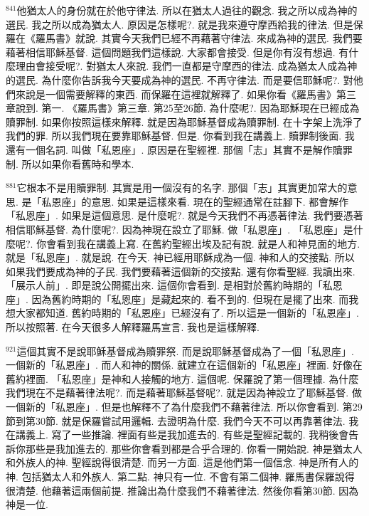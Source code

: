 \documentclass{book}
\begin{document}
$^{841}$他猶太人的身份就在於他守律法.
所以在猶太人過往的觀念.
我之所以成為神的選民.
我之所以成為猶太人.
原因是怎樣呢?.
就是我來遵守摩西給我的律法.
但是保羅在《羅馬書》就說.
其實今天我們已經不再藉著守律法.
來成為神的選民.
我們要藉著相信耶穌基督.
這個問題我們這樣說.
大家都會接受.
但是你有沒有想過.
有什麼理由會接受呢?.
對猶太人來說.
我們一直都是守摩西的律法.
成為猶太人成為神的選民.
為什麼你告訴我今天要成為神的選民.
不再守律法.
而是要信耶穌呢?.
對他們來說是一個需要解釋的東西.
而保羅在這裡就解釋了.
如果你看《羅馬書》第三章說到.
第一.
《羅馬書》第三章.
第25至26節.
為什麼呢?.
因為耶穌現在已經成為贖罪制.
如果你按照這樣來解釋.
就是因為耶穌基督成為贖罪制.
在十字架上洗淨了我們的罪.
所以我們現在要靠耶穌基督.
但是.
你看到我在講義上.
贖罪制後面.
我還有一個名詞.
叫做「私恩座」.
原因是在聖經裡.
那個「志」其實不是解作贖罪制.
所以如果你看舊時和學本.

$^{881}$它根本不是用贖罪制.
其實是用一個沒有的名字.
那個「志」其實更加常大的意思.
是「私恩座」的意思.
如果是這樣來看.
現在的聖經通常在註腳下.
都會解作「私恩座」.
如果是這個意思.
是什麼呢?.
就是今天我們不再憑著律法.
我們要憑著相信耶穌基督.
為什麼呢?.
因為神現在設立了耶穌.
做「私恩座」.
「私恩座」是什麼呢?.
你會看到我在講義上寫.
在舊約聖經出埃及記有說.
就是人和神見面的地方.
就是「私恩座」.
就是說.
在今天.
神已經用耶穌成為一個.
神和人的交接點.
所以如果我們要成為神的子民.
我們要藉著這個新的交接點.
還有你看聖經.
我讀出來.
「展示人前」.
即是說公開擺出來.
這個你會看到.
是相對於舊約時期的「私恩座」.
因為舊約時期的「私恩座」是藏起來的.
看不到的.
但現在是擺了出來.
而我想大家都知道.
舊約時期的「私恩座」已經沒有了.
所以這是一個新的「私恩座」.
所以按照著.
在今天很多人解釋羅馬宣言.
我也是這樣解釋.

$^{921}$這個其實不是說耶穌基督成為贖罪祭.
而是說耶穌基督成為了一個「私恩座」.
一個新的「私恩座」.
而人和神的關係.
就建立在這個新的「私恩座」裡面.
好像在舊約裡面.
「私恩座」是神和人接觸的地方.
這個呢.
保羅說了第一個理據.
為什麼我們現在不是藉著律法呢?.
而是藉著耶穌基督呢?.
就是因為神設立了耶穌基督.
做一個新的「私恩座」.
但是也解釋不了為什麼我們不藉著律法.
所以你會看到.
第29節到第30節.
就是保羅嘗試用邏輯.
去證明為什麼.
我們今天不可以再靠著律法.
我在講義上.
寫了一些推論.
裡面有些是我加進去的.
有些是聖經記載的.
我稍後會告訴你那些是我加進去的.
那些你會看到都是合乎合理的.
你看一開始說.
神是猶太人和外族人的神.
聖經說得很清楚.
而另一方面.
這是他們第一個信念.
神是所有人的神.
包括猶太人和外族人.
第二點.
神只有一位.
不會有第二個神.
羅馬書保羅說得很清楚.
他藉著這兩個前提.
推論出為什麼我們不藉著律法.
然後你看第30節.
因為神是一位.
\end{document}
